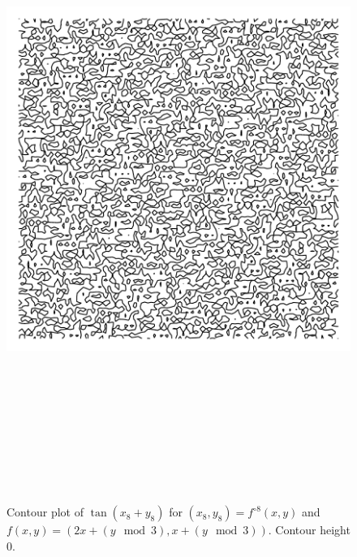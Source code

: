 \documentclass[12pt, a4paper]{amsart}
\begin{document}
\begin{figure}[!ht] 
\includegraphics[width=160mm, height=210mm]{arnolds_cat3.pdf}
\caption{
Contour plot of $\tan(x_8 + y_8)$ for $(x_8, y_8) = f^{\circ 8}(x, y)$ and  $f(x, y) = (2x + (y \mod 3), x + (y \mod 3))$.
Contour height 0.
}
\end{figure}
\end{document}
